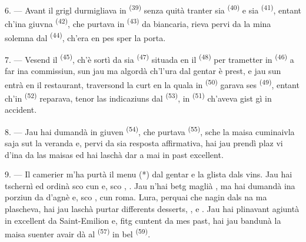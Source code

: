 \VUsaut{4.0mm}
\VUsaut{3.0mm}

6. --- Avant il grigl durmigliava in  \textsuperscript{(39)} senza
quità tranter sia  \textsuperscript{(40)} e sia  \textsuperscript{(41)}, entant ch'ina giuvna  \textsuperscript{(42)},
che purtava in  \textsuperscript{(43)} da biancaria, rieva pervi da la
mina solemna dal  \textsuperscript{(44)}, ch'era en pes sper la
porta.

7. --- Vesend il  \textsuperscript{(45)}, ch'è sortì da sia
 \textsuperscript{(47)} situada en il  \textsuperscript{(48)}
per trametter in  \textsuperscript{(46)} a far ina commissiun,
sun jau ma algordà ch'l'ura dal gentar è prest, e jau sun entrà en il restaurant,
traversond la curt en la quala in  \textsuperscript{(50)} garava ses
 \textsuperscript{(49)}, entant ch'in  \textsuperscript{(52)}
reparava, tenor las indicaziuns dal  \textsuperscript{(53)}, in
 \textsuperscript{(51)} ch'aveva gist gì in accident.

8. --- Jau hai dumandà in giuven  \textsuperscript{(54)}, che purtava
 \textsuperscript{(55)}, sche la maisa cuminaivla saja sut la
veranda e, pervi da sia resposta affirmativa, hai jau prendì plaz vi d'ina da las
maisas ed hai laschà dar a mai in past excellent.


\VUsaut{4.0mm}
\VUsaut{3.0mm}

9. --- Il camerier m'ha purtà il menu (*) dal gentar e la glista dals vins. Jau hai
tschernì ed ordinà sco  cun  e, sco
, . Jau n'hai betg maglià
, ma hai dumandà ina porziun da  d'agnè e, sco ,  cun roma. Lura, perquai che nagin dals 
na ma plascheva, hai jau laschà purtar differents desserts, ,
 e . Jau hai plinavant agiuntà in excellent
 da Saint-Emilion e, fitg cuntent da mes past, hai jau bandunà la maisa
suenter avair dà al  \textsuperscript{(57)} in bel 
\textsuperscript{(59)}.

